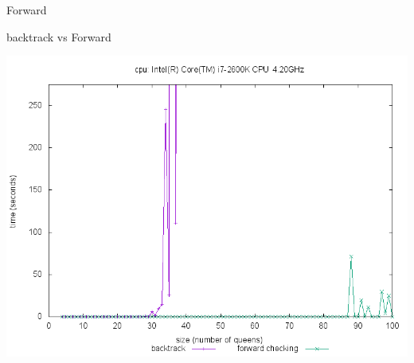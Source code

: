 \documentclass[10pt,a4paper]{beamer}
\begin{document}
\begin{frame}
\begin{block}{Forward}
	\end{block}
	
	\begin{block}{backtrack vs Forward}
	
	\includegraphics[width=1\textwidth]{images/plot_bt_fw_i7.png}
	
	\end{block}
	
	

\end{frame}
\end{document}
